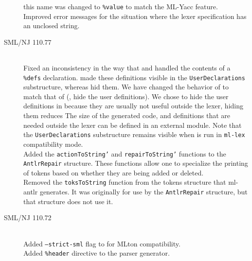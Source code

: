 \begin{description}
    this name was changed to \texttt{\%value} to match the ML-Yacc feature.
    \\[0.5em]
    Improved error messages for the situation where the lexer specification has an unclosed string.
%
  \item[SML/NJ 110.77]
    \mbox{}\\[0.5em]
    Fixed an inconsistency in the way that \mlantlr{} and \ulex{} handled the contents of
    a \texttt{\%defs} declaration.  \ulex{} made these definitions visible in the \texttt{UserDeclarations}
    substructure, whereas \mlantlr{} hid them.  We have changed the behavior of \ulex{} to match
    that of \mlantlr{} (\ie{}, hide the user definitions).  We chose to hide the user definitions
    in \ulex{} because they are usually not useful outside the lexer, hiding them reduces The
    size of the generated code, and definitions that are needed outside the lexer can be
    defined in an external module.  Note that the \texttt{UserDeclarations} substructure remains
    visible when \ulex{} is run in \texttt{ml-lex} compatibility mode.
    \\[0.5em]
    Added the \texttt{actionToString'} and \texttt{repairToString'} functions
    to the \texttt{AntlrRepair} structure.  These functions allow one to
    specialize the printing of tokens based on whether they are being added or deleted.
    \\[0.5em]
    Removed the \texttt{toksToString} function from the tokens structure that ml-antlr
    generates.  It was originally for use by the \texttt{AntlrRepair} structure, but that
    structure does not use it.
%
  \item[SML/NJ 110.72]
    \mbox{}\\[0.5em]
    Added \texttt{--strict-sml} flag to \ulex{} for MLton compatibility.
    \\[0.5em]
    Added \texttt{\%header} directive to the \mlantlr{} parser generator.
\end{description}%

